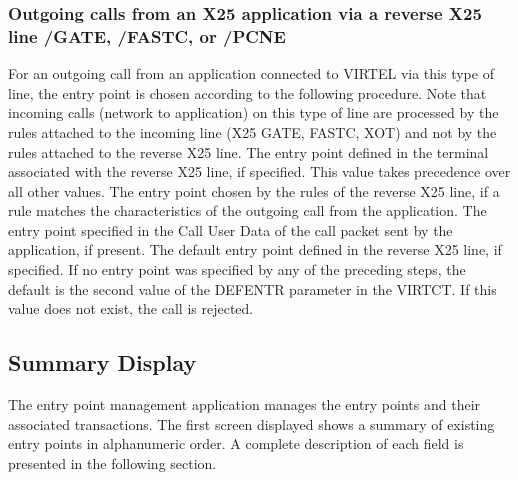 \documentclass[letterpaper,10pt,english]{sphinxmanual}
\begin{document}
\subsubsection{Outgoing calls from an X25 application via a reverse X25 line \sphinxhyphen{} /GATE, /FASTC, or /PCNE}
\label{\detokenize{connectivity_guide:outgoing-calls-from-an-x25-application-via-a-reverse-x25-line-gate-fastc-or-pcne}}
\sphinxAtStartPar
For an outgoing call from an application connected to VIRTEL via this type of line, the entry point is chosen according
to the following procedure. Note that incoming calls (network to application) on this type of line are processed by the
rules attached to the incoming line (X25 GATE, FASTC, XOT) and not by the rules attached to the reverse X25 line.
\sphinxhyphen{} The entry point defined in the terminal associated with the reverse X25 line, if specified. This value takes precedence over all other values.
\sphinxhyphen{} The entry point chosen by the rules of the reverse X25 line, if a rule matches the characteristics of the outgoing call from the application.
\sphinxhyphen{} The entry point specified in the Call User Data of the call packet sent by the application, if present.
\sphinxhyphen{} The default entry point defined in the reverse X25 line, if specified.
\sphinxhyphen{} If no entry point was specified by any of the preceding steps, the default is the second value of the DEFENTR parameter in the VIRTCT. If this value does not exist, the call is rejected.

\ignorespaces 

\subsection{Summary Display}
\label{\detokenize{connectivity_guide:index-109}}\label{\detokenize{connectivity_guide:id59}}
\sphinxAtStartPar
The entry point management application manages the entry points and their associated transactions. The first screen displayed shows a summary of existing entry points in alphanumeric order. A complete description of each field is presented in the following section.

\sphinxAtStartPar
{}
\end{document}
